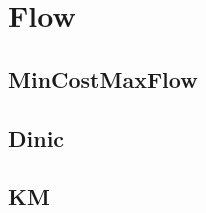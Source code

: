 \clearpage


%

%

%

%

%

%

%

%

\section{Flow}

\subsection{MinCostMaxFlow}




\subsection{Dinic}




\subsection{KM}


\newpage




